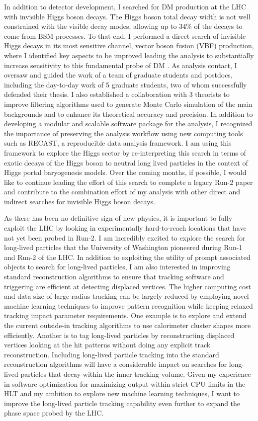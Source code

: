 \documentclass[a4paper]{article}
\begin{document}
In addition to detector development, I searched for DM production at the LHC with invisible Higgs boson decays. The Higgs boson total decay width is not well constrained with the visible decay modes, allowing up to 34\% of the decays to come from BSM processes. To that end, I performed a direct search of invisible Higgs decays in its most sensitive channel, vector boson fusion (VBF) production, where I identified key aspects to be improved leading the analysis to substantially increase sensitivity to this fundamental probe of DM \cite{vbfMET_CONF2020}. As analysis contact, I oversaw and guided the work of a team of graduate students and postdocs, including the day-to-day work of 5 graduate students, two of whom successfully defended their thesis. I also established a collaboration with 3 theorists to improve filtering algorithms used to generate Monte Carlo simulation of the main backgrounds and to enhance its theoretical accuracy and precision. In addition to developing a modular and scalable software package for the analysis, I recognized the importance of preserving the analysis workflow using new computing tools such as RECAST, a reproducible data analysis framework. I am using this framework to explore the Higgs sector by re-interpreting this search in terms of exotic decays of the Higgs boson to neutral long lived particles in the context of Higgs portal baryogenesis models. Over the coming months, if possible, I would like to continue leading the effort of this search to complete a legacy Run-2 paper and contribute to the combination effort of my analysis with other direct and indirect searches for invisible Higgs boson decays.

\bigskip

As there has been no definitive sign of new physics, it is important to fully exploit the LHC by looking in experimentally hard-to-reach locations that have not yet been probed in Run-2. I am incredibly excited to explore the search for long-lived particles that the University of Washington pioneered during Run-1 and Run-2 of the LHC. In addition to exploiting the utility of prompt associated objects to search for long-lived particles, I am also interested in improving standard reconstruction algorithms to ensure that tracking software and triggering are efficient at detecting displaced vertices. The higher computing cost and data size of large-radius tracking can be largely reduced by employing novel machine learning techniques to improve pattern recognition while keeping relaxed tracking impact parameter requirements. One example is to explore and extend the current outside-in tracking algorithms to use calorimeter cluster shapes more efficiently. Another is to tag long-lived particles by reconstructing displaced vertices looking at the hit patterns without doing any explicit track reconstruction. Including long-lived particle tracking into the standard reconstruction algorithms will have a considerable impact on searches for long-lived particles that decay within the inner tracking volume. Given my experience in software optimization for maximizing output within strict CPU limits in the HLT and my ambition to explore new machine learning techniques, I want to improve the long-lived particle tracking capability even further to expand the phase space probed by the LHC.
\end{document}
